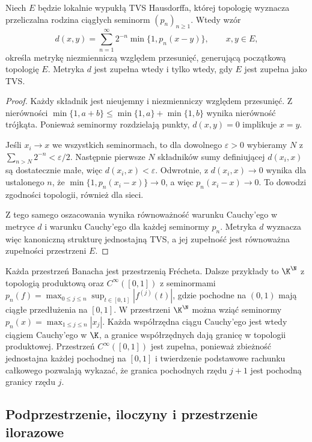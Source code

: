 \begin{stwierdzenie}\label{prop:frechet-metric11}
Niech $E$ będzie lokalnie wypukłą TVS Hausdorffa, której topologię
wyznacza przeliczalna rodzina ciągłych seminorm $(p_n)_{n\ge1}$.
Wtedy wzór
\[
 d(x,y)=\sum_{n=1}^{\infty}2^{-n}\min\{1,p_n(x-y)\},\qquad x,y\in E,
\]
określa metrykę niezmienniczą względem przesunięć, generującą
początkową topologię $E$. Metryka $d$ jest zupełna wtedy i tylko
wtedy, gdy $E$ jest zupełna jako TVS.
\end{stwierdzenie}
\begin{proof}
Każdy składnik jest nieujemny i niezmienniczy względem przesunięć.
Z nierówności $\min\{1,a+b\}\le \min\{1,a\}+\min\{1,b\}$
wynika nierówność trójkąta. Ponieważ seminormy rozdzielają punkty,
$d(x,y)=0$ implikuje $x=y$.

Jeśli $x_i\to x$ we wszystkich seminormach, to dla dowolnego
$\varepsilon>0$ wybieramy $N$ z $\sum_{n>N}2^{-n}<\varepsilon/2$.
Następnie pierwsze $N$ składników sumy definiującej $d(x_i,x)$
są dostatecznie małe, więc $d(x_i,x)<\varepsilon$.
Odwrotnie, z $d(x_i,x)\to0$ wynika dla ustalonego $n$,
że $\min\{1,p_n(x_i-x)\}\to0$, a więc $p_n(x_i-x)\to0$.
To dowodzi zgodności topologii, również dla sieci.

Z tego samego oszacowania wynika równoważność warunku Cauchy'ego
w metryce $d$ i warunku Cauchy'ego dla każdej seminormy $p_n$.
Metryka $d$ wyznacza więc kanoniczną strukturę jednostajną TVS,
a jej zupełność jest równoważna zupełności przestrzeni $E$.
\end{proof}

\begin{przyklad}\label{ex:frechet-list11}
Każda przestrzeń Banacha jest przestrzenią Frécheta. Dalsze
przykłady to $\K^{\N}$ z topologią produktową oraz
$C^\infty([0,1])$ z seminormami
$p_n(f)=\max_{0\le j\le n}\sup_{t\in[0,1]}|f^{(j)}(t)|$,
gdzie pochodne na $(0,1)$ mają ciągłe przedłużenia na $[0,1]$.
W przestrzeni $\K^{\N}$ można wziąć seminormy
$p_n(x)=\max_{1\le j\le n}|x_j|$. Każda współrzędna ciągu
Cauchy'ego jest wtedy ciągiem Cauchy'ego w $\K$, a granice
współrzędnych dają granicę w topologii produktowej.
Przestrzeń $C^\infty([0,1])$ jest zupełna, ponieważ zbieżność
jednostajna każdej pochodnej na $[0,1]$ i twierdzenie podstawowe
rachunku całkowego pozwalają wykazać, że granica pochodnych
rzędu $j+1$ jest pochodną granicy rzędu $j$.
\end{przyklad}

\subsection{Podprzestrzenie, iloczyny i przestrzenie ilorazowe}

